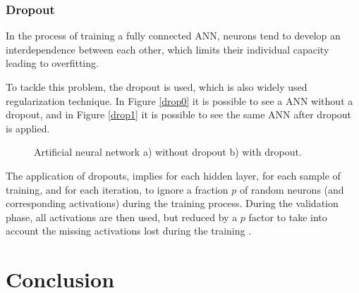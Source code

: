 \subsubsection{Dropout}

In the process of training a fully connected \ac{ANN}, neurons tend to develop an interdependence between each other, which limits their individual capacity leading to overfitting.


To tackle this problem, the dropout is used, which is also widely used regularization technique. In Figure \ref{drop0} it is possible to see a \ac{ANN} without a dropout, and in Figure \ref{drop1} it is possible to see the same \ac{ANN} after dropout is applied.

\begin{figure}[h!]
\captionsetup[subfigure]{position=b}
\centering
\label{fig:drop}
\hspace{0.05\textwidth}
\caption{Artificial neural network a) without dropout b) with dropout.}
\end{figure}

The application of dropouts, implies for each hidden layer, for each sample of training, and for each iteration, to ignore a fraction $p$ of random neurons (and corresponding activations) during the training process. During the validation phase, all activations are then used, but reduced by a $p$ factor to take into account the missing activations lost during the training \cite{drop0}.

\section{Conclusion}

